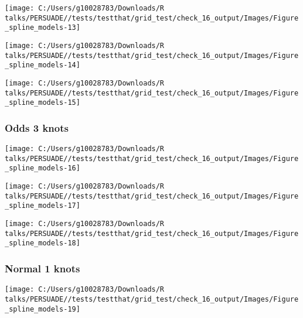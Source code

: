 \documentclass[
]{article}
\begin{document}
\begin{flushleft}\texttt{[image: C:/Users/g10028783/Downloads/R talks/PERSUADE//tests/testthat/grid\_test/check\_16\_output/Images/Figure\_spline\_models-13]} \end{flushleft}

\begin{flushleft}\texttt{[image: C:/Users/g10028783/Downloads/R talks/PERSUADE//tests/testthat/grid\_test/check\_16\_output/Images/Figure\_spline\_models-14]} \end{flushleft}

\begin{flushleft}\texttt{[image: C:/Users/g10028783/Downloads/R talks/PERSUADE//tests/testthat/grid\_test/check\_16\_output/Images/Figure\_spline\_models-15]} \end{flushleft}

\clearpage

\subsubsection{Odds 3 knots}\label{odds-3-knots}

\begin{flushleft}\texttt{[image: C:/Users/g10028783/Downloads/R talks/PERSUADE//tests/testthat/grid\_test/check\_16\_output/Images/Figure\_spline\_models-16]} \end{flushleft}

\begin{flushleft}\texttt{[image: C:/Users/g10028783/Downloads/R talks/PERSUADE//tests/testthat/grid\_test/check\_16\_output/Images/Figure\_spline\_models-17]} \end{flushleft}

\begin{flushleft}\texttt{[image: C:/Users/g10028783/Downloads/R talks/PERSUADE//tests/testthat/grid\_test/check\_16\_output/Images/Figure\_spline\_models-18]} \end{flushleft}

\clearpage

\subsubsection{Normal 1 knots}\label{normal-1-knots}

\begin{flushleft}\texttt{[image: C:/Users/g10028783/Downloads/R talks/PERSUADE//tests/testthat/grid\_test/check\_16\_output/Images/Figure\_spline\_models-19]} \end{flushleft}
\end{document}
